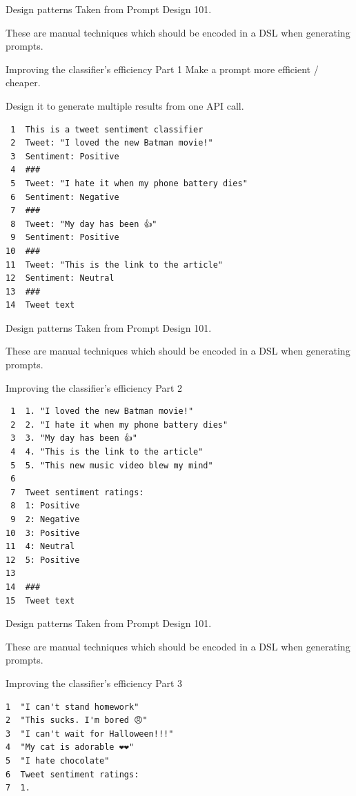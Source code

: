\documentclass[presentation]{beamer}
\begin{document}
\begin{frame}[label={sec:org0f2c7c9},fragile]{Design patterns}
 Taken from Prompt Design 101.

These are manual techniques which should be
encoded in a DSL when generating prompts.

\begin{block}{Improving the classifier’s efficiency Part 1}
Make a prompt more efficient / cheaper.

Design it to generate multiple results from
one API call.

{\tiny
\begin{verbatim}
 1  This is a tweet sentiment classifier
 2  Tweet: "I loved the new Batman movie!"
 3  Sentiment: Positive
 4  ###
 5  Tweet: "I hate it when my phone battery dies"
 6  Sentiment: Negative
 7  ###
 8  Tweet: "My day has been 👍"
 9  Sentiment: Positive
10  ###
11  Tweet: "This is the link to the article"
12  Sentiment: Neutral
13  ###
14  Tweet text
\end{verbatim}

}
\end{block}
\end{frame}

\begin{frame}[label={sec:org12825eb},fragile]{Design patterns}
 Taken from Prompt Design 101.

These are manual techniques which should be
encoded in a DSL when generating prompts.

\begin{block}{Improving the classifier’s efficiency Part 2}
{\tiny
\begin{verbatim}
 1  1. "I loved the new Batman movie!"
 2  2. "I hate it when my phone battery dies"
 3  3. "My day has been 👍"
 4  4. "This is the link to the article"
 5  5. "This new music video blew my mind"
 6  
 7  Tweet sentiment ratings:
 8  1: Positive
 9  2: Negative
10  3: Positive
11  4: Neutral
12  5: Positive
13  
14  ###
15  Tweet text
\end{verbatim}
}
\end{block}
\end{frame}

\begin{frame}[label={sec:orge50214e},fragile]{Design patterns}
 Taken from Prompt Design 101.

These are manual techniques which should be
encoded in a DSL when generating prompts.

\begin{block}{Improving the classifier’s efficiency Part 3}
{\footnotesize
\begin{verbatim}
1  "I can't stand homework"
2  "This sucks. I'm bored 😠"
3  "I can't wait for Halloween!!!"
4  "My cat is adorable ❤️❤️"
5  "I hate chocolate"
6  Tweet sentiment ratings:
7  1.
\end{verbatim}
}
\end{block}
\end{frame}
\end{document}
